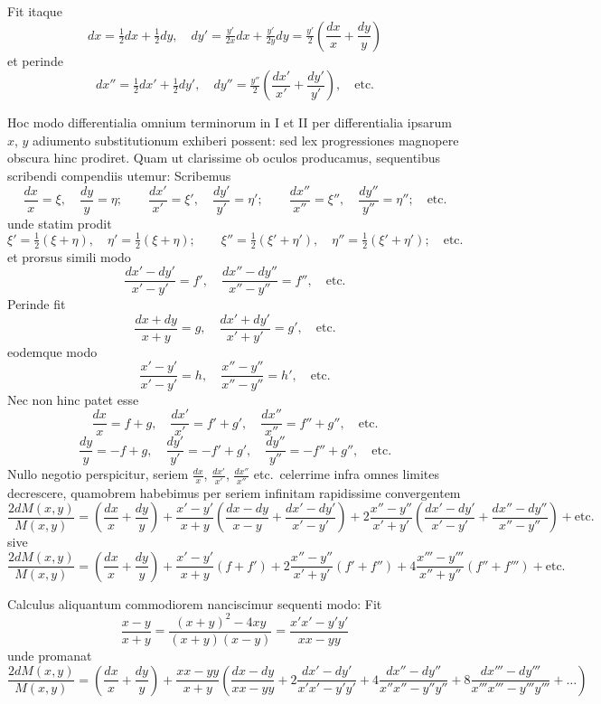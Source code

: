 \documentclass[12pt,a4paper]{article}
\begin{document}
Fit itaque
\[
dx = \tfrac{1}{2}dx + \tfrac{1}{2}dy, \quad dy' = \tfrac{y'}{2x}dx + \tfrac{y'}{2y}dy = \tfrac{y'}{2}\left(\frac{dx}{x}+\frac{dy}{y}\right)
\]
et perinde
\[
dx'' = \tfrac{1}{2}dx' + \tfrac{1}{2}dy', \quad dy'' = \tfrac{y''}{2}\left(\frac{dx'}{x'}+\frac{dy'}{y'}\right), \quad\text{etc.}
\]

Hoc modo differentialia omnium terminorum in I et II per differentialia ipsarum $x$, $y$ adiumento substitutionum exhiberi possent: sed lex progressiones magnopere obscura hinc prodiret. Quam ut clarissime ob oculos producamus, sequentibus scribendi compendiis utemur: Scribemus
\[
\frac{dx}{x} = \xi, \quad \frac{dy}{y} = \eta; \qquad
\frac{dx'}{x'} = \xi', \quad \frac{dy'}{y'} = \eta'; \qquad
\frac{dx''}{x''} = \xi'', \quad \frac{dy''}{y''} = \eta''; \quad\text{etc.}
\]
unde statim prodit
\[
\xi' = \tfrac{1}{2}(\xi+\eta), \quad \eta' = \tfrac{1}{2}(\xi+\eta); \qquad
\xi'' = \tfrac{1}{2}(\xi'+\eta'), \quad \eta'' = \tfrac{1}{2}(\xi'+\eta'); \quad\text{etc.}
\]
et prorsus simili modo
\[
\frac{dx'-dy'}{x'-y'} = f', \quad \frac{dx''-dy''}{x''-y''} = f'', \quad\text{etc.}
\]
Perinde fit
\[
\frac{dx+dy}{x+y} = g, \quad \frac{dx'+dy'}{x'+y'} = g', \quad\text{etc.}
\]
eodemque modo
\[
\frac{x'-y'}{x'-y'} = h, \quad \frac{x''-y''}{x''-y''} = h', \quad\text{etc.}
\]
Nec non hinc patet esse
\[
\frac{dx}{x} = f + g, \quad \frac{dx'}{x'} = f' + g', \quad \frac{dx''}{x''} = f'' + g'', \quad\text{etc.}
\]
\[
\frac{dy}{y} = -f + g, \quad \frac{dy'}{y'} = -f' + g', \quad \frac{dy''}{y''} = -f'' + g'', \quad\text{etc.}
\]
Nullo negotio perspicitur, seriem $\frac{dx}{x}$, $\frac{dx'}{x'}$, $\frac{dx''}{x''}$ etc.\ celerrime infra omnes limites decrescere, quamobrem habebimus per seriem infinitam rapidissime convergentem
\[
\frac{2dM(x,y)}{M(x,y)} = \left(\frac{dx}{x}+\frac{dy}{y}\right) + \frac{x'-y'}{x+y}\left(\frac{dx-dy}{x-y}+\frac{dx'-dy'}{x'-y'}\right) + 2\frac{x''-y''}{x'+y'}\left(\frac{dx'-dy'}{x'-y'}+\frac{dx''-dy''}{x''-y''}\right) + \text{etc.}
\]
sive
\[
\frac{2dM(x,y)}{M(x,y)} = \left(\frac{dx}{x}+\frac{dy}{y}\right) + \frac{x'-y'}{x+y}(f+f') + 2\frac{x''-y''}{x'+y'}(f'+f'') + 4\frac{x'''-y'''}{x''+y''}(f''+f''') + \text{etc.}
\]

Calculus aliquantum commodiorem nanciscimur sequenti modo: Fit
\[
\frac{x-y}{x+y} = \frac{(x+y)^2-4xy}{(x+y)(x-y)} = \frac{x'x'-y'y'}{xx-yy}
\]
unde promanat
\[
\frac{2dM(x,y)}{M(x,y)} = \left(\frac{dx}{x}+\frac{dy}{y}\right) + \frac{xx-yy}{x+y}\left(\frac{dx-dy}{xx-yy} + 2\frac{dx'-dy'}{x'x'-y'y'} + 4\frac{dx''-dy''}{x''x''-y''y''} + 8\frac{dx'''-dy'''}{x'''x'''-y'''y'''}+\dots\right)
\]
\end{document}
